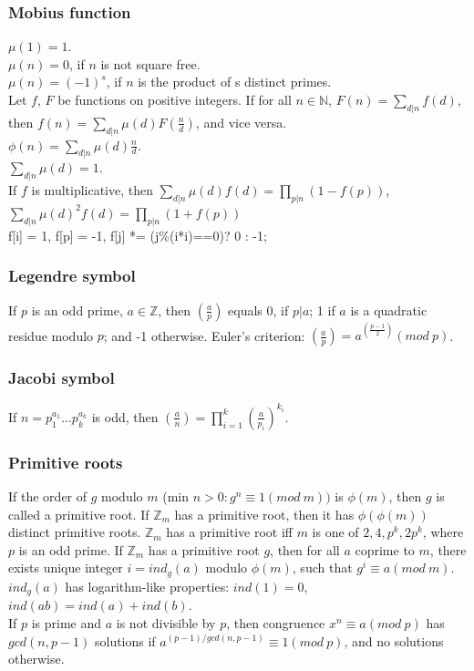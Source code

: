 \documentclass[a4paper,13pt]{article}
\begin{document}
\subsubsection{Mobius function}
$\mu(1) = 1$.\\
$\mu(n) = 0$, if $n$ is not square free.\\
$\mu(n) = (-1)^{s}$, if $n$ is the product of s distinct primes.\\
Let $f$, $F$ be functions on positive integers. If for all $n \in \mathbb{N}$, $F(n) = \sum_{d|n}f(d)$, then $f(n) = \sum_{d|n}\mu(d)F(\frac{n}{d})$, and vice versa.\\
$\phi(n) = \sum_{d|n}\mu(d)\frac{n}{d}$.\\
$\sum_{d|n}\mu(d) = 1$.\\
If $f$ is multiplicative, then $\sum_{d|n}\mu(d)f(d) = \prod_{p|n}(1-f(p))$, $\sum_{d|n}\mu(d)^2f(d) = \prod_{p|n}(1+f(p))$\\
f[i] = 1, f[p] = -1, f[j] *= (j\%(i*i)==0)? 0 : -1;

\subsubsection{Legendre symbol}
If $p$ is an odd prime, $a \in \mathbb{Z}$, then $(\frac{a}{p})$ equals 0, if $p|a$; 1 if $a$ is a quadratic residue modulo $p$; and -1 otherwise. Euler's criterion: $(\frac{a}{p}) = a^{(\frac{p-1}{2})} (mod\ p)$.

\subsubsection{Jacobi symbol}
If $n = p_1^{a_1}...p_k^{a_k}$ is odd, then $(\frac{a}{n}) = \prod_{i=1}^k(\frac{a}{p_i})^{k_i}$.

\subsubsection{Primitive roots}
If the order of $g$ modulo $m$ (min $n > 0: g^n \equiv 1 (mod\ m))$ is $\phi(m)$, then $g$ is called a primitive root.
If $\mathbb{Z}_m$ has a primitive root, then it has $\phi(\phi(m))$ distinct primitive roots.
$\mathbb{Z}_m$ has a primitive root iff $m$ is one of $2, 4, p^k, 2p^k$, where $p$ is an odd prime. If $\mathbb{Z}_m$ has a primitive root $g$, then for all $a$ coprime to $m$, there exists unique integer $i = ind_g(a)$ modulo $\phi(m)$,
such that $g^i \equiv a (mod\ m)$. $ind_g(a)$ has logarithm-like properties: $ind(1) = 0$, $ind(ab) = ind(a) + ind(b)$.\\
If $p$ is prime and $a$ is not divisible by $p$, then congruence $x^n \equiv a (mod\ p)$ has $gcd(n, p - 1)$ solutions if $a^{(p-1)/ gcd(n,p-1)} \equiv 1 (mod\ p)$, and no solutions otherwise.
\end{document}
